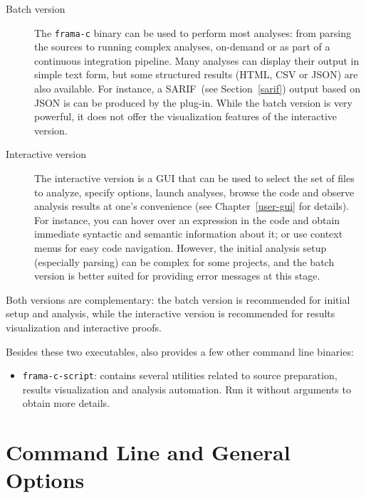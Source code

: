 \begin{description}
\item[Batch version]

  The \texttt{frama-c} binary can be used to perform most \FramaC analyses:
  from parsing the sources to running complex analyses, on-demand or as part
  of a continuous integration pipeline. Many analyses can display their output
  in simple text form, but some structured results (HTML, CSV or JSON) are
  also available. For instance, a SARIF~(see Section~\ref{sarif}) output
  based on JSON is can be produced by the  plug-in.
  While the batch version is very powerful, it does not offer the visualization
  features of the interactive version.

\item[Interactive version]
  The interactive version is a GUI that can be used to select the set of files
  to analyze, specify options, launch analyses, browse the code and observe
  analysis results at one's convenience (see Chapter~\ref{user-gui} for
  details). For instance, you can hover over an expression in the code and
  obtain immediate syntactic and semantic information about it; or use context
  menus for easy code navigation.
  However, the initial analysis setup (especially parsing) can be complex for
  some projects, and the batch version is better suited for providing error
  messages at this stage.

\end{description}

Both versions are complementary: the batch version is recommended
for initial setup and analysis, while the interactive version is recommended for
results visualization and interactive proofs.

Besides these two executables, \FramaC also provides a few other command line
binaries:
\begin{itemize}
\item \texttt{frama-c-script}: contains several
  utilities related to source preparation, results visualization and analysis
  automation. Run it without arguments to obtain more details.
\end{itemize}

\section{\FramaC Command Line and General Options}

